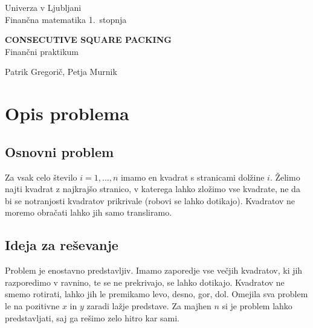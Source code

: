 \documentclass[a4paper, 11pt]{article}
\newcommand{\program}{Finančna matematika 1.~stopnja} %
\newcommand{\imeavtorja}{Patrik Gregorič, Petja Murnik} %
\newcommand{\naslovdela}{Consecutive square packing}
\newcommand{\letnica}{2022}
\newcommand{\predmet}{Finančni praktikum}
\begin{document}
\thispagestyle{empty}
\begin{center}
\begin{minipage}{0.75\linewidth}
    \centering
    {\Large Univerza v Ljubljani \\ \program}
    \\
    \vspace{3cm}

    {\uppercase{\Large \textbf{\naslovdela}}} \\ \predmet\\
    \vspace{3cm}

    {\Large \imeavtorja\par}
    \vspace{9cm}

\end{minipage}
\end{center}

\noindent{\large
Ljubljana, \letnica}
\pagebreak

\thispagestyle{empty}
\tableofcontents
\listoffigures
\pagebreak


\section{Opis problema}

\subsection{Osnovni problem}
Za vsak celo število $i =1, \dots , n$ imamo en kvadrat s stranicami 
dolžine $i$. Želimo najti kvadrat z najkrajšo stranico, v katerega lahko 
zložimo vse kvadrate, ne da bi se notranjosti kvadratov prikrivale (robovi se lahko 
dotikajo). Kvadratov ne moremo obračati lahko jih samo transliramo.

\subsection{Ideja za reševanje}
Problem je enostavno predstavljiv. Imamo zaporedje vse večjih kvadratov, ki jih razporedimo
v ravnino, te se ne prekrivajo, se lahko dotikajo. Kvadratov ne smemo rotirati, lahko
jih le premikamo levo, desno, gor, dol. Omejila sva problem le na pozitivne $x$ in $y$
zaradi lažje predstave. Za majhen $n$ si je problem lahko predstavljati, saj ga
rešimo zelo hitro kar sami.
\end{document}
